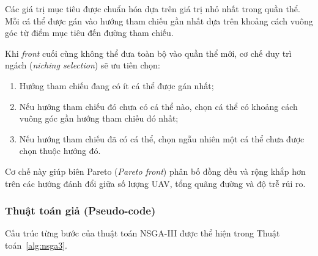 \documentclass{article}
\begin{document}
Các giá trị mục tiêu được chuẩn hóa dựa trên giá trị nhỏ nhất trong quần thể. Mỗi cá thể được gán vào hướng tham chiếu gần nhất dựa trên khoảng cách vuông góc từ điểm mục tiêu đến đường tham chiếu.

Khi \textit{front} cuối cùng không thể đưa toàn bộ vào quần thể mới, cơ chế duy trì ngách (\textit{niching selection}) sẽ ưu tiên chọn:
\begin{enumerate}
    \item Hướng tham chiếu đang có ít cá thể được gán nhất;
    \item Nếu hướng tham chiếu đó chưa có cá thể nào, chọn cá thể có khoảng cách vuông góc gần hướng tham chiếu đó nhất;
    \item Nếu hướng tham chiếu đã có cá thể, chọn ngẫu nhiên một cá thể chưa được chọn thuộc hướng đó.
\end{enumerate}
Cơ chế này giúp biên Pareto (\textit{Pareto front}) phân bố đồng đều và rộng khắp hơn trên các hướng đánh đổi giữa số lượng UAV, tổng quãng đường và độ trễ rủi ro.

\subsubsection{Thuật toán giả (Pseudo-code)}

Cấu trúc từng bước của thuật toán NSGA-III được thể hiện trong Thuật toán~\ref{alg:nsga3}.
\end{document}
